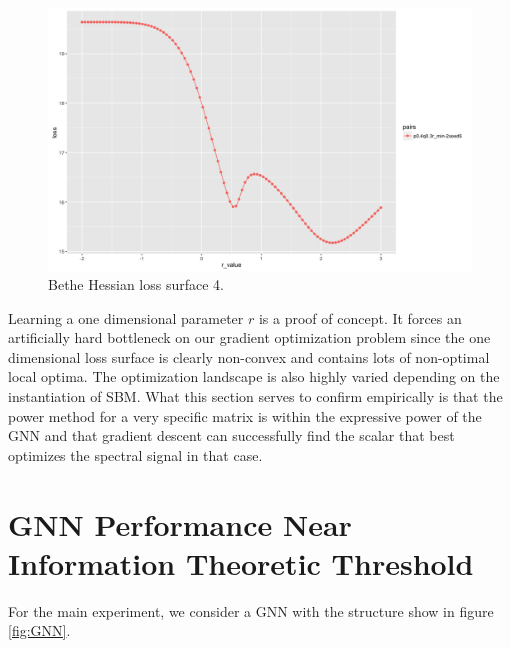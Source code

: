 \begin{figure}[H]
\begin{center}
\includegraphics[scale=0.4]{loss_surface_4.png}
\caption{Bethe Hessian loss surface 4.}
 \end{center}
\end{figure}
 
Learning a one dimensional parameter $r$ is a proof of concept.  It forces an artificially hard bottleneck on our gradient optimization problem since the one dimensional loss surface is clearly non-convex and contains lots of non-optimal local optima. The optimization landscape is also highly varied depending on the instantiation of SBM.  What this section serves to confirm empirically is that the power method for a very specific matrix is within the expressive power of the GNN and that gradient descent can successfully find the scalar that best optimizes the spectral signal in that case. 

\section{GNN Performance Near Information Theoretic Threshold}

For the main experiment, we consider a GNN with the structure show in figure \ref{fig:GNN}.



